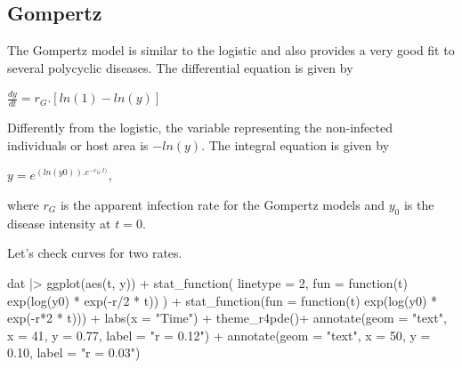 \documentclass[
  letterpaper,
]{book}
\newenvironment{Shaded}{\begin{snugshade}}{\end{snugshade}}
\newcommand{\AttributeTok}[1]{\textcolor[rgb]{0.40,0.45,0.13}{#1}}
\newcommand{\ControlFlowTok}[1]{\textcolor[rgb]{0.00,0.23,0.31}{#1}}
\newcommand{\DecValTok}[1]{\textcolor[rgb]{0.68,0.00,0.00}{#1}}
\newcommand{\FloatTok}[1]{\textcolor[rgb]{0.68,0.00,0.00}{#1}}
\newcommand{\FunctionTok}[1]{\textcolor[rgb]{0.28,0.35,0.67}{#1}}
\newcommand{\NormalTok}[1]{\textcolor[rgb]{0.00,0.23,0.31}{#1}}
\newcommand{\SpecialCharTok}[1]{\textcolor[rgb]{0.37,0.37,0.37}{#1}}
\newcommand{\StringTok}[1]{\textcolor[rgb]{0.13,0.47,0.30}{#1}}
\begin{document}
\hypertarget{gompertz}{%
\subsection{Gompertz}\label{gompertz}}

The Gompertz model is similar to the logistic and also provides a very
good fit to several polycyclic diseases. The differential equation is
given by

\(\frac{dy}{dt} = r_G.[ln(1) - ln(y)]\)

Differently from the logistic, the variable representing the
non-infected individuals or host area is \(-ln(y)\). The integral
equation is given by

\(y = e^{(ln(y0)).{e^{-r_G.t)}}}\),

where \(r_G\) is the apparent infection rate for the Gompertz models and
\(y_0\) is the disease intensity at \(t = 0\).

Let's check curves for two rates.

\begin{Shaded}
\begin{Highlighting}[]
\NormalTok{dat }\SpecialCharTok{|\textgreater{}}
  \FunctionTok{ggplot}\NormalTok{(}\FunctionTok{aes}\NormalTok{(t, y)) }\SpecialCharTok{+}
  \FunctionTok{stat\_function}\NormalTok{(}
    \AttributeTok{linetype =} \DecValTok{2}\NormalTok{,}
    \AttributeTok{fun =} \ControlFlowTok{function}\NormalTok{(t) }\FunctionTok{exp}\NormalTok{(}\FunctionTok{log}\NormalTok{(y0) }\SpecialCharTok{*} \FunctionTok{exp}\NormalTok{(}\SpecialCharTok{{-}}\NormalTok{r}\SpecialCharTok{/}\DecValTok{2} \SpecialCharTok{*}\NormalTok{ t))}
\NormalTok{  ) }\SpecialCharTok{+}
  \FunctionTok{stat\_function}\NormalTok{(}\AttributeTok{fun =} \ControlFlowTok{function}\NormalTok{(t) }\FunctionTok{exp}\NormalTok{(}\FunctionTok{log}\NormalTok{(y0) }\SpecialCharTok{*} \FunctionTok{exp}\NormalTok{(}\SpecialCharTok{{-}}\NormalTok{r}\SpecialCharTok{*}\DecValTok{2} \SpecialCharTok{*}\NormalTok{ t))) }\SpecialCharTok{+}
  \FunctionTok{labs}\NormalTok{(}\AttributeTok{x =} \StringTok{"Time"}\NormalTok{) }\SpecialCharTok{+}
 \FunctionTok{theme\_r4pde}\NormalTok{()}\SpecialCharTok{+}
  \FunctionTok{annotate}\NormalTok{(}\AttributeTok{geom =} \StringTok{"text"}\NormalTok{, }\AttributeTok{x =} \DecValTok{41}\NormalTok{, }\AttributeTok{y =} \FloatTok{0.77}\NormalTok{, }\AttributeTok{label =} \StringTok{"r = 0.12"}\NormalTok{) }\SpecialCharTok{+}
  \FunctionTok{annotate}\NormalTok{(}\AttributeTok{geom =} \StringTok{"text"}\NormalTok{, }\AttributeTok{x =} \DecValTok{50}\NormalTok{, }\AttributeTok{y =} \FloatTok{0.10}\NormalTok{, }\AttributeTok{label =} \StringTok{"r = 0.03"}\NormalTok{)}
\end{Highlighting}
\end{Shaded}
\end{document}
